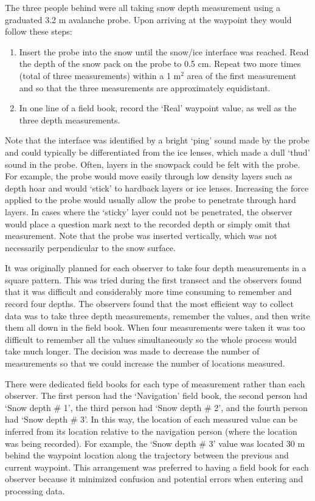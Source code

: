 \documentclass[12pt]{article}
\begin{document}
The three people behind were all taking snow depth measurement using a graduated 3.2 m avalanche probe. Upon arriving at the waypoint they would follow these steps:
\begin{enumerate}
\item Insert the probe into the snow until the snow/ice interface was reached. Read the depth of the snow pack on the probe to 0.5 cm. Repeat two more times (total of three measurements) within a 1 m$^2$ area of the first measurement and so that the three measurements are approximately equidistant. 
\item In one line of a field book, record the `Real' waypoint value, as well as the three depth measurements. 
\end{enumerate}
Note that the interface was identified by a bright `ping' sound made by the probe and could typically be differentiated from the ice lenses, which made a dull `thud' sound in the probe. Often, layers in the snowpack could be felt with the probe. For example, the probe would move easily through low density layers such as depth hoar and would `stick' to hardback layers or ice lenses. Increasing the force applied to the probe would usually allow the probe to penetrate through hard layers. In cases where the `sticky' layer could not be penetrated, the observer would place a question mark next to the recorded depth or simply omit that measurement. Note that the probe was inserted vertically, which was not necessarily perpendicular to the snow surface.

It was originally planned for each observer to take four depth measurements in a square pattern. This was tried during the first transect and the observers found that it was difficult and considerably more time consuming to remember and record four depths. The observers found that the most efficient way to collect data was to take three depth measurements, remember the values, and then write them all down in the field book. When four measurements were taken it was too difficult to remember all the values simultaneously so the whole process would take much longer. The decision was made to decrease the number of measurements so that we could increase the number of locations measured. 

There were dedicated field books for each type of measurement rather than each observer. The first person had the `Navigation' field book, the second person had `Snow depth \# 1', the third person had `Snow depth \# 2', and the fourth person had `Snow depth \# 3'. In this way, the location of each measured value can be inferred from its location relative to the navigation person (where the location was being recorded). For example, the `Snow depth \# 3' value was located 30 m behind the waypoint location along the trajectory between the previous and current waypoint. This arrangement was preferred to having a field book for each observer because it minimized confusion and potential errors when entering and processing data.
\end{document}
